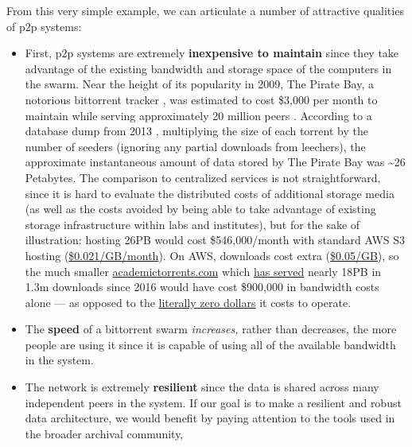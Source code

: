 From this very simple example, we can articulate a number of attractive
qualities of p2p systems:

\begin{itemize}

\item
  First, p2p systems are extremely \textbf{inexpensive to maintain}
  since they take advantage of the existing bandwidth and storage space
  of the computers in the swarm. Near the height of its popularity in
  2009, The Pirate Bay, a notorious bittorrent tracker \citep{vandersarPirateBayFive2011} , was estimated to cost \$3,000 per
  month to maintain while serving approximately 20 million peers \citep{roettgersPirateBayDistributing2009} . According to a database
  dump from 2013 \citep{PirateBayArchiveteam2020} , multiplying
  the size of each torrent by the number of seeders (ignoring any
  partial downloads from leechers), the approximate instantaneous amount
  of data stored by The Pirate Bay was \textasciitilde26 Petabytes. The
  comparison to centralized services is not straightforward, since it is
  hard to evaluate the distributed costs of additional storage media (as
  well as the costs avoided by being able to take advantage of existing
  storage infrastructure within labs and institutes), but for the sake
  of illustration: hosting 26PB would cost \$546,000/month with standard
  AWS S3 hosting
  (\href{https://aws.amazon.com/s3/pricing/?nc=sn\&loc=4}{\$0.021/GB/month}).
  On AWS, downloads cost extra
  (\href{https://aws.amazon.com/s3/pricing/?nc=sn\&loc=4}{\$0.05/GB}),
  so the much smaller
  \href{https://academictorrents.com}{academictorrents.com} which
  \href{https://github.com/academictorrents/academictorrents-docs/issues/31\#issuecomment-1155917166}{has
  served} nearly 18PB in 1.3m downloads since 2016 would have cost
  \$900,000 in bandwidth costs alone --- as opposed to the
  \href{https://github.com/academictorrents/academictorrents-docs/issues/31\#issuecomment-1152851111}{literally
  zero dollars} it costs to operate.
\item
  The \textbf{speed} of a bittorrent swarm \emph{increases,} rather than
  decreases, the more people are using it since it is capable of using
  all of the available bandwidth in the system.
\item
  The network is extremely \textbf{resilient} since the data is shared
  across many independent peers in the system. If our goal is to make a
  resilient and robust data architecture, we would benefit by paying
  attention to the tools used in the broader archival community,

\end{itemize}

